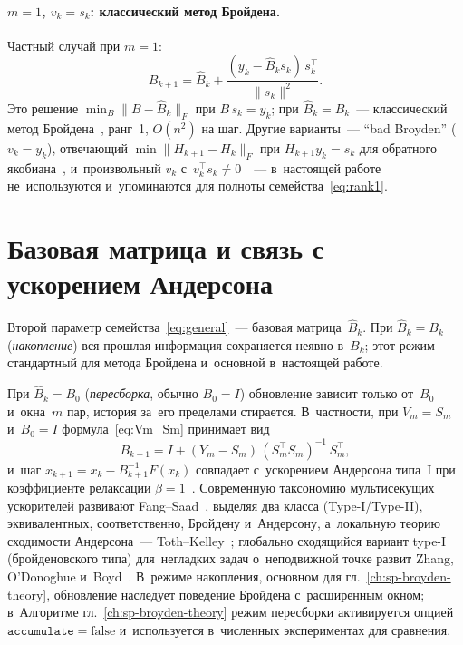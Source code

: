 \paragraph{$m=1$, $v_k = s_k$: классический метод Бройдена.}
Частный случай при $m=1$:
\begin{equation}\label{eq:good_broyden}
  B_{k+1} = \widehat{B}_k + \frac{(y_k - \widehat{B}_k s_k)\,s_k^\top}{\|s_k\|^2}.
\end{equation}
Это решение $\min_B \|B - \widehat{B}_k\|_F$ при $B\,s_k = y_k$;
при $\widehat{B}_k = B_k$~--- классический метод
Бройдена~\cite{broyden1965}, ранг~1, $O(n^2)$ на шаг. Другие
варианты~--- ``bad Broyden'' ($v_k=y_k$), отвечающий
$\min\|H_{k+1}-H_k\|_F$ при $H_{k+1} y_k=s_k$ для обратного
якобиана~\cite{broyden1965,dennis1996}, и~произвольный $v_k$
с~$v_k^\top s_k\ne 0$~\cite{gay1979}~--- в~настоящей работе
не~используются и~упоминаются для полноты семейства~\eqref{eq:rank1}.


\section{Базовая матрица и связь с ускорением Андерсона}\label{sec:ch1_base}

Второй параметр семейства~\eqref{eq:general}~--- базовая
матрица~$\widehat{B}_k$. При $\widehat{B}_k=B_k$ (\emph{накопление})
вся прошлая информация сохраняется неявно в~$B_k$; этот режим~---
стандартный для метода Бройдена и~основной в~настоящей работе.


При $\widehat{B}_k=B_0$ (\emph{пересборка}, обычно $B_0=I$) обновление
зависит только от~$B_0$ и~окна~$m$ пар, история за~его пределами
стирается. В~частности, при $V_m=S_m$ и~$B_0=I$
формула~\eqref{eq:Vm_Sm} принимает вид
\begin{equation}\label{eq:anderson}
  B_{k+1} = I + (Y_m - S_m)\,(S_m^\top S_m)^{-1}\,S_m^\top,
\end{equation}
и~шаг $x_{k+1}=x_k - B_{k+1}^{-1} F(x_k)$ совпадает с~ускорением
Андерсона типа~I при коэффициенте релаксации
$\beta=1$~\cite{anderson1965,walker2011,fang2009}. Современную
таксономию мультисекущих ускорителей развивают
Fang--Saad~\cite{fang2009}, выделяя два класса (Type-I/Type-II),
эквивалентных, соответственно, Бройдену и~Андерсону, а~локальную
теорию сходимости Андерсона~--- Toth--Kelley~\cite{toth2015}; глобально
сходящийся вариант type-I (бройденовского типа) для~негладких задач
о~неподвижной точке развит Zhang, O'Donoghue и~Boyd~\cite{zhang2020anderson}. В~режиме
накопления, основном для гл.~\ref{ch:sp-broyden-theory}, обновление
наследует поведение Бройдена с~расширенным окном; в~Алгоритме
гл.~\ref{ch:sp-broyden-theory} режим пересборки активируется опцией
$\mathtt{accumulate}=\text{false}$ и~используется в~численных
экспериментах для сравнения.


